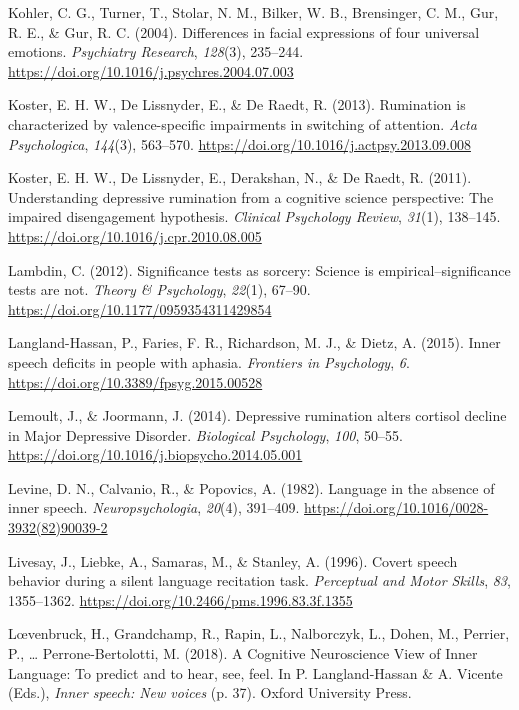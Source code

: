 \documentclass[a4paper,12pt,twoside,openright,oldfontcommands]{memoir}
\begin{document}
\hypertarget{ref-kohler_differences_2004}{}
Kohler, C. G., Turner, T., Stolar, N. M., Bilker, W. B., Brensinger, C.
M., Gur, R. E., \& Gur, R. C. (2004). Differences in facial expressions
of four universal emotions. \emph{Psychiatry Research}, \emph{128}(3),
235--244. \url{https://doi.org/10.1016/j.psychres.2004.07.003}

\hypertarget{ref-Koster2013}{}
Koster, E. H. W., De Lissnyder, E., \& De Raedt, R. (2013). Rumination
is characterized by valence-specific impairments in switching of
attention. \emph{Acta Psychologica}, \emph{144}(3), 563--570.
\url{https://doi.org/10.1016/j.actpsy.2013.09.008}

\hypertarget{ref-Koster2011}{}
Koster, E. H. W., De Lissnyder, E., Derakshan, N., \& De Raedt, R.
(2011). Understanding depressive rumination from a cognitive science
perspective: The impaired disengagement hypothesis. \emph{Clinical
Psychology Review}, \emph{31}(1), 138--145.
\url{https://doi.org/10.1016/j.cpr.2010.08.005}

\hypertarget{ref-Lambdin2012}{}
Lambdin, C. (2012). Significance tests as sorcery: Science is
empirical--significance tests are not. \emph{Theory \& Psychology},
\emph{22}(1), 67--90. \url{https://doi.org/10.1177/0959354311429854}

\hypertarget{ref-langland-hassan_inner_2015}{}
Langland-Hassan, P., Faries, F. R., Richardson, M. J., \& Dietz, A.
(2015). Inner speech deficits in people with aphasia. \emph{Frontiers in
Psychology}, \emph{6}. \url{https://doi.org/10.3389/fpsyg.2015.00528}

\hypertarget{ref-Lemoult2014}{}
Lemoult, J., \& Joormann, J. (2014). Depressive rumination alters
cortisol decline in Major Depressive Disorder. \emph{Biological
Psychology}, \emph{100}, 50--55.
\url{https://doi.org/10.1016/j.biopsycho.2014.05.001}

\hypertarget{ref-levine_language_1982}{}
Levine, D. N., Calvanio, R., \& Popovics, A. (1982). Language in the
absence of inner speech. \emph{Neuropsychologia}, \emph{20}(4),
391--409. \url{https://doi.org/10.1016/0028-3932(82)90039-2}

\hypertarget{ref-livesay_covert_1996}{}
Livesay, J., Liebke, A., Samaras, M., \& Stanley, A. (1996). Covert
speech behavior during a silent language recitation task.
\emph{Perceptual and Motor Skills}, \emph{83}, 1355--1362.
\url{https://doi.org/10.2466/pms.1996.83.3f.1355}

\hypertarget{ref-loevenbruck_cognitive_2018}{}
Lœvenbruck, H., Grandchamp, R., Rapin, L., Nalborczyk, L., Dohen, M.,
Perrier, P., \ldots{} Perrone-Bertolotti, M. (2018). A Cognitive
Neuroscience View of Inner Language: To predict and to hear, see, feel.
In P. Langland-Hassan \& A. Vicente (Eds.), \emph{Inner speech: New
voices} (p. 37). Oxford University Press.
\end{document}
